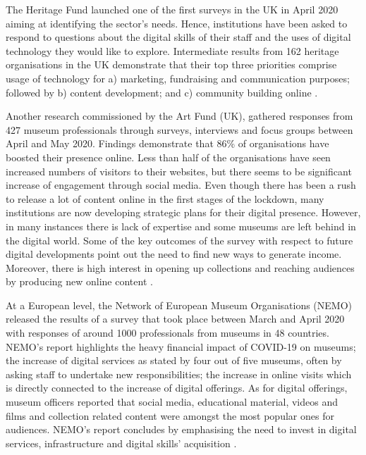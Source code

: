 \documentclass{egpubl}
\begin{document}
The Heritage Fund launched one of the first surveys in the UK in April 2020 aiming at identifying the sector's needs. Hence, institutions have been asked to respond to questions about the digital skills of their staff and the uses of digital technology they would like to explore. Intermediate results from 162 heritage organisations in the UK demonstrate that their top three priorities comprise usage of technology for a) marketing, fundraising and communication purposes; followed by b) content development; and c) community building online \cite{HeritageFund2020}.

Another research commissioned by the Art Fund (UK), gathered responses from 427 museum professionals through surveys, interviews and focus groups between April and May 2020. Findings demonstrate that 86\% of organisations have boosted their presence online. Less than half of the organisations have seen increased numbers of visitors to their websites, but there seems to be significant increase of engagement through social media. Even though there has been a rush to release a lot of content online in the first stages of the lockdown, many institutions are now developing strategic plans for their digital presence. However, in many instances there is lack of expertise and some museums are left behind in the digital world. Some of the key outcomes of the survey with respect to future digital developments point out the need to find new ways to generate income. Moreover, there is high interest in opening up collections and reaching audiences by producing new online content \cite{WaferHadley2020}.

At a European level, the Network of European Museum Organisations (NEMO) released the results of a survey that took place between March and April 2020 with responses of around 1000 professionals from museums in 48 countries. NEMO's report highlights the heavy financial impact of COVID-19 on museums; the increase of digital services as stated by four out of five museums, often by asking staff to undertake new responsibilities; the increase in online visits which is directly connected to the increase of digital offerings. As for digital offerings, museum officers reported that social media, educational material, videos and films and collection related content were amongst the most popular ones for audiences. NEMO's report concludes by emphasising the need to invest in digital services, infrastructure and digital skills' acquisition \cite{NetworkofEuropeanMuseumOrganisations20202}.
\end{document}
